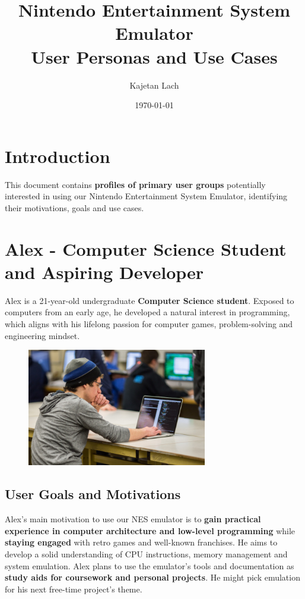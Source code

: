 \documentclass[a4paper, 11pt]{article}
\title{%
\vspace{-2.5cm}
\textbf{Nintendo Entertainment System Emulator}\\
User Personas and Use Cases
}
\date{\today}
\author{Kajetan Lach}
\begin{document}
\maketitle

\section{Introduction}
This document contains \textbf{profiles of primary user groups} potentially interested in using our Nintendo Entertainment System Emulator, identifying their motivations, goals and use cases.

\section{Alex - Computer Science Student and Aspiring Developer}
Alex is a 21-year-old undergraduate \textbf{Computer Science student}. Exposed to computers from an early age, he developed a natural interest in programming, which aligns with his lifelong passion for computer games, problem-solving and engineering mindset.

\begin{figure}[h]
    \centering
    \includegraphics[width=0.7\textwidth]{student-coding.jpg}
\end{figure}

\subsection{User Goals and Motivations}
Alex's main motivation to use our NES emulator is to \textbf{gain practical experience in computer architecture and low-level programming} while \textbf{staying engaged} with retro games and well-known franchises. He aims to develop a solid understanding of CPU instructions, memory management and system emulation. Alex plans to use the emulator's tools and documentation as \textbf{study aids for coursework and personal projects}. He might pick emulation for his next free-time project's theme.
\end{document}
